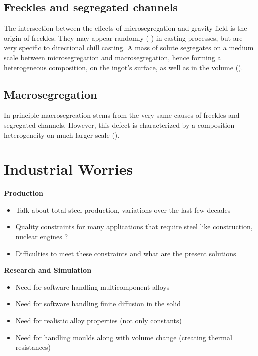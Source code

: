 \subsection*{Freckles and segregated channels} 
The intersection between the effects of microsegregation and gravity field is the origin of freckles. They may appear 
randomly ( ) in casting processes, but are very specific to directional chill casting. A mass of solute 
segregates on a medium scale between microsegregation and macrosegregation, hence forming a heterogeneous composition, 
on the ingot's surface, as well as in the volume ().
\subsection*{Macrosegregation}
In principle macrosegreation stems from the very same causes of freckles and segregated channels. However, this defect is characterized by a composition heterogeneity on much larger scale (). 



\section*{Industrial Worries}
\textbf{Production}
\begin{itemize}
\item Talk about total steel production, variations over the last few decades
\item Quality constraints for many applications that require steel like construction, nuclear engines ? 
\item Difficulties to meet these constraints and what are the present solutions
\end{itemize}
\textbf{Research and Simulation}
\begin{itemize}
\item Need for software handling multicomponent alloys
\item Need for software handling finite diffusion in the solid
\item Need for realistic alloy properties (not only constants)
\item Need for handling moulds along with volume change (creating thermal resistances)
\end{itemize}


